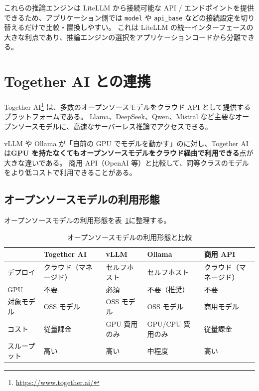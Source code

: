 \documentclass[a4paper,11pt]{ltjsarticle}
\newcommand{\code}[1]{\texttt{#1}}
\begin{document}
\begin{tipbox}[ポイント]
これらの推論エンジンは LiteLLM から接続可能な API / エンドポイントを提供できるため、アプリケーション側では \code{model} や \code{api\_base} などの接続設定を切り替えるだけで比較・置換しやすい。
これは LiteLLM の統一インターフェースの大きな利点であり、推論エンジンの選択をアプリケーションコードから分離できる。
\end{tipbox}


\section{Together AI との連携}
\label{sec:together}

Together AI\footnote{\url{https://www.together.ai/}} は、多数のオープンソースモデルをクラウド API として提供するプラットフォームである。
Llama、DeepSeek、Qwen、Mistral など主要なオープンソースモデルに、高速なサーバーレス推論でアクセスできる。

vLLM や Ollama が「自前の GPU でモデルを動かす」のに対し、Together AI は\textbf{GPU を持たなくてもオープンソースモデルをクラウド経由で利用できる}点が大きな違いである。
商用 API（OpenAI 等）と比較して、同等クラスのモデルをより低コストで利用できることがある。

\subsection{オープンソースモデルの利用形態}

オープンソースモデルの利用形態を表~\ref{tab:oss_deploy}に整理する。

\begin{table}[htbp]
\centering
\caption{オープンソースモデルの利用形態と比較}
\label{tab:oss_deploy}
\begin{tabular}{lp{2.5cm}p{2.5cm}p{2.5cm}p{2.5cm}}
\toprule
         & \textbf{Together AI} & \textbf{vLLM} & \textbf{Ollama} & \textbf{商用 API} \\
\midrule
デプロイ  & クラウド（マネージド） & セルフホスト & セルフホスト & クラウド（マネージド） \\
GPU      & 不要                & 必須         & 不要（推奨） & 不要 \\
対象モデル & OSS モデル          & OSS モデル   & OSS モデル   & 商用モデル \\
コスト    & 従量課金            & GPU 費用のみ & GPU/CPU 費用のみ & 従量課金 \\
スループット & 高い              & 高い         & 中程度        & 高い \\
\bottomrule
\end{tabular}
\end{table}
\end{document}
